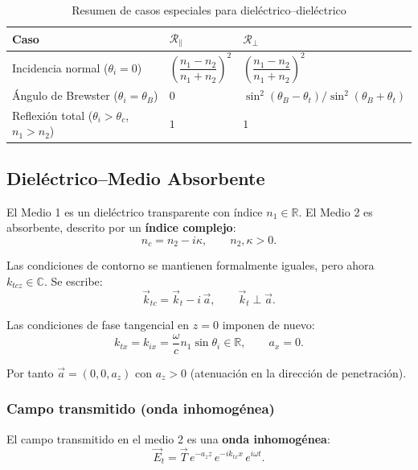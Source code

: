 \documentclass[12pt, a4paper]{article}
\theoremstyle{plain}
\theoremstyle{definition}
\theoremstyle{remark}
\newcommand{\R}{\mathbb{R}}
\newcommand{\C}{\mathbb{C}}
\newcommand{\ve}[1]{\vec{#1}}
\begin{document}
\begin{table}[H]
  \centering
  \caption{Resumen de casos especiales para dieléctrico--dieléctrico}
  \label{tab:casos_especiales}
  \begin{tabularx}{0.98\linewidth}{@{}L{5.2cm}Y Y@{}}
    \toprule
    \textbf{Caso} & $\mathcal{R}_\parallel$ & $\mathcal{R}_\perp$ \\
    \midrule
    Incidencia normal ($\theta_i = 0$)
      & $\left(\dfrac{n_1-n_2}{n_1+n_2}\right)^2$
      & $\left(\dfrac{n_1-n_2}{n_1+n_2}\right)^2$ \\
    Ángulo de Brewster ($\theta_i = \theta_B$)
      & $0$
      & $\sin^2(\theta_B - \theta_t)/\sin^2(\theta_B + \theta_t)$ \\
    Reflexión total ($\theta_i > \theta_c$, $n_1>n_2$)
      & $1$
      & $1$ \\
    \bottomrule
  \end{tabularx}
\end{table}

\subsection{Dieléctrico--Medio Absorbente}

El Medio 1 es un dieléctrico transparente con índice $n_1 \in \R$.
El Medio 2 es absorbente, descrito por un \textbf{índice complejo}:
\[
  n_c = n_2 - i\kappa, \qquad n_2, \kappa > 0.
\]

Las condiciones de contorno se mantienen formalmente iguales, pero ahora
$k_{tcz} \in \C$. Se escribe:
\[
  \ve{k}_{tc} = \ve{k}_t - i\,\ve{a}, \qquad \ve{k}_t \perp \ve{a}.
\]

Las condiciones de fase tangencial en $z = 0$ imponen de nuevo:
\[
  k_{tx} = k_{ix} = \frac{\omega}{c}n_1\sin\theta_i \in \R,
  \qquad a_x = 0.
\]

Por tanto $\ve{a} = (0, 0, a_z)$ con $a_z > 0$ (atenuación en la dirección
de penetración).

\subsubsection{Campo transmitido (onda inhomogénea)}

El campo transmitido en el medio 2 es una \textbf{onda inhomogénea}:
\begin{equation}
  \ve{E}_t = \ve{T}\,e^{-a_z z}\,e^{-ik_{tx} x}\,e^{i\omega t}.
  \label{eq:transmitida_metal}
\end{equation}
\end{document}

